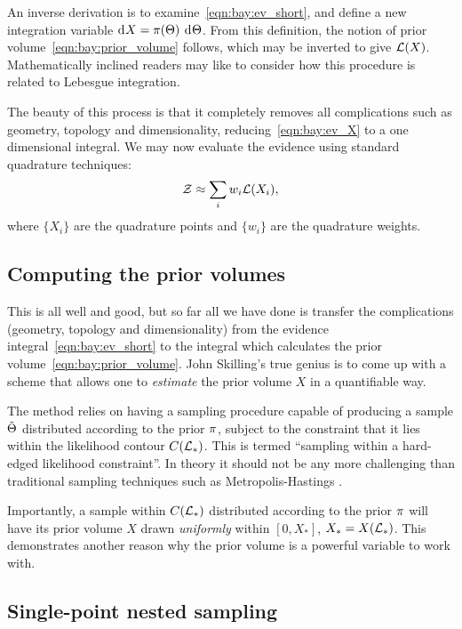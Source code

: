 An inverse derivation is to examine~\eqref{eqn:bay:ev_short}, and define a new integration variable \(\operatorname{d}^{}\!{X} = \pi(\Theta)\:\operatorname{d}^{}\!{\Theta}\). From this definition, the notion of prior volume~\eqref{eqn:bay:prior_volume} follows, which may be inverted to give \(\mathcal{L}(X)\). Mathematically inclined readers may like to consider how this procedure is related to Lebesgue integration.

The beauty of this process is that it completely removes all complications such as geometry, topology and dimensionality, reducing~\eqref{eqn:bay:ev_X} to a one dimensional integral.  We may now evaluate the evidence using standard quadrature techniques:
\begin{equation}
  \mathcal{Z} \approx \sum_{i} w_i \mathcal{L}(X_i),
  \label{eqn:bay:quadrature}
\end{equation}
where \(\{X_i\}\) are the quadrature points and \(\{w_i\}\) are the quadrature weights. 

\subsection{Computing the prior volumes}

This is all well and good, but so far all we have done is transfer the complications (geometry, topology and dimensionality) from the evidence integral~\eqref{eqn:bay:ev_short} to the integral which calculates the prior volume~\eqref{eqn:bay:prior_volume}. John Skilling's true genius is to come up with a scheme that allows one to {\em estimate\/} the prior volume \(X\) in a quantifiable way.

The method relies on having a sampling procedure capable of producing a sample \(\tilde{\Theta}\) distributed according to the prior \(\pi\), subject to the constraint that it lies within the likelihood contour \(C(\mathcal{L}_\ast)\).  This is termed ``sampling within a hard-edged likelihood constraint''.  In theory it should not be any more challenging than traditional sampling techniques such as Metropolis-Hastings \citep{skilling2006}. 

Importantly, a sample within \(C(\mathcal{L}_\ast)\) distributed according to the prior \(\pi\) will have its prior volume \(X\) drawn {\em uniformly\/} within \([0,X_\ast]\), \(X_\ast=X(\mathcal{L}_\ast)\). This demonstrates another reason why the prior volume is a powerful variable to work with.

\subsection{Single-point nested sampling}


